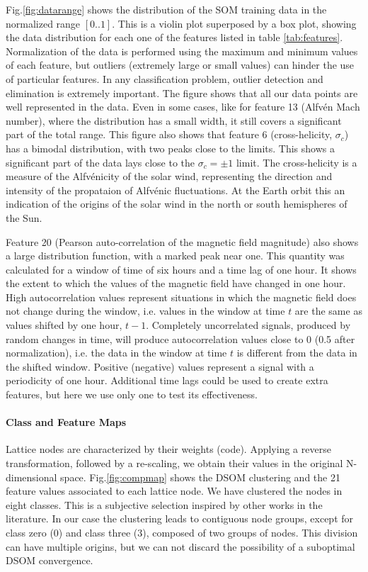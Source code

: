 Fig.\ref{fig:datarange} shows the distribution of the SOM training data in the normalized range $\left[0..1\right]$. This is a violin plot superposed by a box plot, showing the data distribution for each one of the features listed in table \ref{tab:features}. Normalization of the data is performed using the maximum and minimum values of each feature, but outliers (extremely large or small values) can hinder the use of particular features. In any classification problem, outlier detection and elimination is extremely important. The figure shows that all our data points are well represented in the data. Even in some cases, like for feature 13 (Alfv\'en Mach number), where the distribution has a small width, it still covers a significant part of the total range. This figure also shows that feature 6 (cross-helicity, $\sigma_c$) has a bimodal distribution, with two peaks close to the limits. This shows a significant part of the data lays close to the $\sigma_c = \pm 1$ limit. The cross-helicity is a measure of the Alfv\'enicity of the solar wind, representing the direction and intensity of the propataion of Alfv\'enic fluctuations. At the Earth orbit this an indication of the origins of the solar wind in the north or south hemispheres of the Sun.

Feature 20 (Pearson auto-correlation of the magnetic field magnitude) also shows a large distribution function, with a marked peak near one. This quantity was calculated for a window of time of six hours and a time lag of one hour. It shows the extent to which the values of the magnetic field have changed in one hour. High autocorrelation values represent situations in which the magnetic field does not change during the window, i.e. values in the window at time $t$ are the same as values shifted by one hour, $t-1$. Completely uncorrelated signals, produced by random changes in time, will produce autocorrelation values close to 0 (0.5 after normalization), i.e. the data in the window at time $t$ is different from the data in the shifted window. Positive (negative) values represent a signal with a periodicity of one hour. Additional time lags could be used to create extra features, but here we use only one to test its effectiveness.

\paragraph{Class and Feature Maps}

Lattice nodes are characterized by their weights (code). Applying a reverse transformation, followed by a re-scaling, we obtain their values in the original N-dimensional space. Fig.\ref{fig:compmap} shows the DSOM clustering and the 21 feature values associated to each lattice node. We have clustered the nodes in eight classes. This is a subjective selection inspired by other works in the literature. In our case the clustering leads to contiguous node groups, except for class zero (0) and class three (3), composed of two groups of nodes. This division can have multiple origins, but we can not discard the possibility of a suboptimal DSOM convergence.

